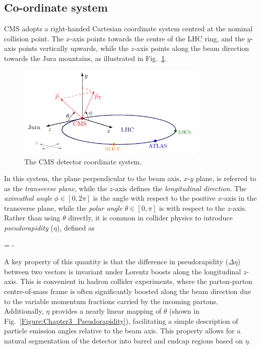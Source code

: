 \clearpage
\subsection{Co-ordinate system}
\ac{CMS} adopts a right-handed Cartesian coordinate system centred at the nominal collision point. The $x$-axis points towards the centre of the \ac{LHC} ring, and the $y$-axis points vertically upwards, while the $z$-axis points along the beam direction towards the Jura mountains, as illustrated in Fig.~\ref{Figure:Chapter3_CMS_CoordinateSystem}.

\begin{figure}[!htbp]
\centering
\includegraphics[width= 0.8\textwidth]{Figures/Chapter3/CMS_CoordinateSystem.pdf}
\caption{The CMS detector coordinate system.}
\label{Figure:Chapter3_CMS_CoordinateSystem}
\end{figure}

In this system, the plane perpendicular to the beam axis, $x$-$y$ plane, is referred to as the \textit{transverse plane}, while the $z$-axis defines the \textit{longitudinal direction}. The \textit{azimuthal angle} $\phi \in [0,2\pi]$ is the angle with respect to the positive $x$-axis in the transverse plane, while the \textit{polar angle} $\theta \in [0,\pi]$ is with respect to the $z$-axis. Rather than using $\theta$ directly, it is common in collider physics to introduce \textit{pseudorapidity} ($\eta$), defined as

\begin{equation_pad}
    \eta = - \ln{}
\end{equation_pad}

A key property of this quantity is that the difference in pseudorapidity ($\Delta\eta$) between two vectors is invariant under Lorentz boosts along the longitudinal $z$-axis. This is convenient in hadron collider experiments, where the parton-parton centre-of-mass frame is often significantly boosted along the beam direction due to the variable momentum fractions carried by the incoming partons. Additionally, $\eta$ provides a nearly linear mapping of $\theta$ (shown in Fig.~\ref{Figure:Chapter3_Pseudorapidity}), facilitating a simple description of particle emission angles relative to the beam axis. This property allows for a natural segmentation of the detector into barrel and endcap regions based on $\eta$.

